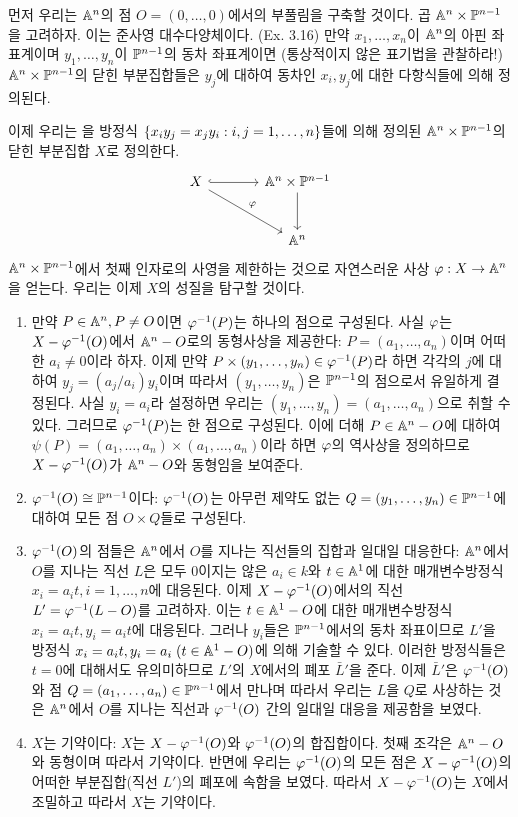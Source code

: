 	먼저 우리는 $\mathbb{A}^n$의 점 $O=(0,\ldots,0)$에서의 부풀림을 구축할 것이다.
	곱 $\mathbb{A}^n\times\mathbb{P}^{n-1}$을 고려하자. 이는 준사영 대수다양체이다. (Ex. 3.16)
	만약 $x_1,\ldots,x_n$이 $\mathbb{A}^n$의 아핀 좌표계이며 $y_1,\ldots,y_n$이 $\mathbb{P}^{n-1}$의 동차 좌표계이면
	(통상적이지 않은 표기법을 관찰하라!) $\mathbb{A}^n\times\mathbb{P}^{n-1}$의 닫힌 부분집합들은 $y_j$에 대하여 동차인
	$x_i,y_j$에 대한 다항식들에 의해 정의된다.
	
	이제 우리는 을
	방정식 $\{x_iy_j=x_jy_i:i,j=1,\ldots,n\}$들에 의해 정의된 $\mathbb{A}^n\times\mathbb{P}^{n-1}$의 닫힌 부분집합 $X$로 정의한다.
	$$\begin{tikzcd}[column sep=large,row sep=large]
	X\arrow[r,hookrightarrow]\arrow[dr,"\ph"]&\An\times\mb P^{n-1}\arrow[d]\\&\An\end{tikzcd}$$
	$\mathbb{A}^n\times\mathbb{P}^{n-1}$에서 첫째 인자로의 사영을 제한하는 것으로 자연스러운 사상 $\varphi:X\rightarrow\mathbb{A}^n$을 얻는다.
	우리는 이제 $X$의 성질을 탐구할 것이다.\\[-2mm]
	\begin{enumerate}[label=(\arabic*)]
	\item 만약 $P\in\mathbb{A}^n,P\ne O$이면 $\varphi^{-1}(P)$는 하나의 점으로 구성된다.
	사실 $\varphi$는 $X-\varphi^{-1}(O)$에서 $\mathbb{A}^n-O$로의 동형사상을 제공한다: $P=(a_1,\ldots,a_n)$이며 어떠한 $a_i\ne 0$이라 하자.
	이제 만약 $P\times(y_1,\ldots,y_n)\in\varphi^{-1}(P)$라 하면 각각의 $j$에 대하여 $y_j=(a_j/a_i)y_i$이며
	따라서 $(y_1,\ldots,y_n)$은 $\mathbb{P}^{n-1}$의 점으로서 유일하게 결정된다.
	사실 $y_i=a_i$라 설정하면 우리는 $(y_1,\ldots,y_n)=(a_1,\ldots,a_n)$으로 취할 수 있다.
	그러므로 $\varphi^{-1}(P)$는 한 점으로 구성된다.
	이에 더해 $P\in\mathbb{A}^n-O$에 대하여 $\psi(P)=(a_1,\ldots,a_n)\times(a_1,\ldots,a_n)$이라 하면 $\varphi$의 역사상을 정의하므로
	$X-\varphi^{-1}(O)$가 $\mathbb{A}^n-O$와 동형임을 보여준다.
	\item $\varphi^{-1}(O)\cong\mathbb{P}^{n-1}$이다:
	$\varphi^{-1}(O)$는 아무런 제약도 없는 $Q=(y_1,\ldots,y_n)\in\mathbb{P}^{n-1}$에 대하여 모든 점 $O\times Q$들로 구성된다.
	\item $\varphi^{-1}(O)$의 점들은 $\mathbb{A}^n$에서 $O$를 지나는 직선들의 집합과 일대일 대응한다:
	$\mathbb{A}^n$에서 $O$를 지나는 직선 $L$은 모두 0이지는 않은 $a_i\in k$와 $t\in\mathbb{A}^1$에 대한
	매개변수방정식 $x_i=a_it,i=1,\ldots,n$에 대응된다. 이제 $X-\varphi^{-1}(O)$에서의 직선 $L'=\varphi^{-1}(L-O)$를 고려하자.
	이는 $t\in\mathbb{A}^1-O$에 대한 매개변수방정식 $x_i=a_it,y_i=a_it$에 대응된다.
	그러나 $y_i$들은 $\mathbb{P}^{n-1}$에서의 동차 좌표이므로 $L'$을 방정식 $x_i=a_it,y_i=a_i\;(t\in\mathbb{A}^1-O)$에 의해 기술할 수 있다.
	이러한 방정식들은 $t=0$에 대해서도 유의미하므로 $L'$의 $X$에서의 폐포 $\bar L'$을 준다.
	이제 $\bar L'$은 $\varphi^{-1}(O)$와 점 $Q=(a_1,\ldots,a_n)\in\mathbb{P}^{n-1}$에서 만나며
	따라서 우리는 $L$을 $Q$로 사상하는 것은 $\mathbb{A}^n$에서 $O$를 지나는 직선과 $\varphi^{-1}(O)$ 간의 일대일 대응을 제공함을 보였다.
	\item $X$는 기약이다: $X$는 $X-\varphi^{-1}(O)$와 $\varphi^{-1}(O)$의 합집합이다.
	첫째 조각은 $\mathbb{A}^n-O$와 동형이며 따라서 기약이다.
	반면에 우리는 $\varphi^{-1}(O)$의 모든 점은 $X-\varphi^{-1}(O)$의 어떠한 부분집합(직선 $L'$)의 폐포에 속함을 보였다.
	따라서 $X-\varphi^{-1}(O)$는 $X$에서 조밀하고 따라서 $X$는 기약이다.
	\end{enumerate}
	
